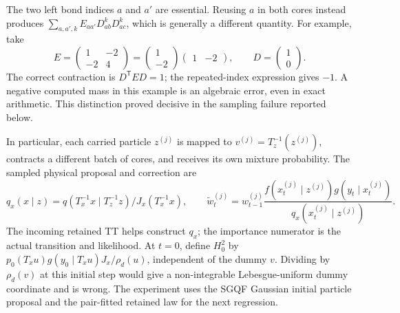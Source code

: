 \documentclass[11pt]{article}
\begin{document}
The two left bond indices $a$ and $a'$ are essential. Reusing $a$ in both
cores instead produces $\sum_{a,a',k}E_{aa'}D_{ab}^kD_{ac}^k$, which is
generally a different quantity. For example, take
\begin{equation}
 E=\begin{pmatrix}1&-2\\-2&4\end{pmatrix}
   =\begin{pmatrix}1\\-2\end{pmatrix}\begin{pmatrix}1&-2\end{pmatrix},
 \qquad D=\begin{pmatrix}1\\0\end{pmatrix}.
 \label{eq:pair-gram-counterexample}
\end{equation}
The correct contraction is $D^{\mathsf T}ED=1$; the repeated-index expression
gives $-1$. A negative computed mass in this example is an algebraic error,
even in exact arithmetic. This distinction proved decisive in the sampling
failure reported below.

In particular, each carried particle $z^{(j)}$ is mapped to
$v^{(j)}=T_z^{-1}(z^{(j)})$, contracts a different batch of cores, and receives
its own mixture probability. The sampled physical proposal and correction are
\begin{equation}
 q_x(x\mid z)=q(T_x^{-1}x\mid T_z^{-1}z)/J_x(T_x^{-1}x),\qquad
 \widetilde w_t^{(j)}=w_{t-1}^{(j)}
 \frac{f(x_t^{(j)}\mid z^{(j)})g(y_t\mid x_t^{(j)})}
 {q_x(x_t^{(j)}\mid z^{(j)})}.
 \label{eq:pair-physical-correction}
\end{equation}
The incoming retained TT helps construct $q_x$; the importance numerator is
the actual transition and likelihood. At $t=0$, define $H_0^2$ by
$p_0(T_xu)g(y_0\mid T_xu)J_x/\rho_d(u)$, independent of the dummy $v$.
Dividing by $\rho_d(v)$ at this initial step would give a non-integrable
Lebesgue-uniform dummy coordinate and is wrong. The experiment uses the SGQF
Gaussian initial particle proposal and the pair-fitted retained law for the
next regression.
\end{document}
